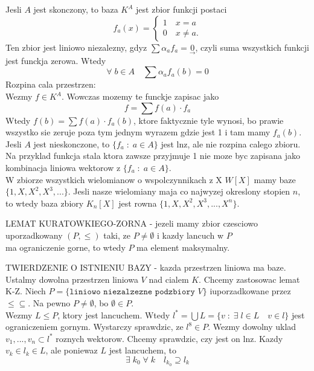 \documentclass{article}
\begin{document}
    Jesli $A$ jest skonczony, to baza $K^A$ jest zbior funkcji postaci 
    $$f_a(x)=\begin{cases}1\quad x=a\\0\quad x\neq a.\end{cases}$$
    Ten zbior jest liniowo niezalezny, gdyz $\sum\alpha_af_a=\underset{\to}{0}$, czyli suma wszystkich funkcji jest funckja zerowa. Wtedy
    $$\forall\;b\in A\quad \sum\alpha_af_a(b)=0$$
    Rozpina cala przestrzen:\smallskip\\
    Wezmy $f\in K^A$. Wowczas mozemy te funckje zapisac jako
    $$f=\sum f(a)\cdot f_a$$
    Wtedy $f(b)= \sum f(a)\cdot f_a(b)$, ktore faktycznie tyle wynosi, bo prawie wszystko sie zeruje poza tym jednym wyrazem gdzie jest 1 i tam mamy $f_a(b)$.\smallskip\\
    Jesli $A$ jest nieskonczone, to $\{f_a\;:\;a\in A\}$ jest lnz, ale nie rozpina calego zbioru. Na przyklad funkcja stala ktora zawsze przyjmuje 1 nie moze byc zapisana jako kombinacja liniowa wektorow z $\{f_a\;:\;a\in A\}$.\medskip\\
    W zbiorze wszystkich wielomianow o wspolczynnikach z X $W[X]$ mamy baze $\{1, X, X^2, X^3, ...\}$. Jesli nasze wielomiany maja co najwyzej okreslony stopien $n$, to wtedy baza zbiory $K_n[X]$ jest rowna $\{1, X, X^2, X^3, ..., X^n\}$.\bigskip\\
    \begin{center}
        \color{def}LEMAT KURATOWKIEGO-ZORNA \color{txt}- jezeli mamy zbior czesciowo \\
        uporzadkowany $(P, \leq)$ taki, ze $P\neq \emptyset$ i kazdy lancuch w $P$ \\
        ma ograniczenie gorne, to wtedy $P$ ma element maksymalny.
    \end{center}\bigskip
    \color{def}TWIERDZENIE O ISTNIENIU BAZY \color{txt}- kazda przestrzen liniowa ma baze.\medskip\\
    Ustalmy dowolna przestrzen liniowa $V$ nad cialem $K$. Chcemy zastosowac lemat K-Z. Niech $P=\{\texttt{liniowo niezalzezne podzbiory }V\}$ iuporzadkowane przez $\leq\subseteq$. Na pewno $P\neq\emptyset$, bo $\emptyset\in P$.\smallskip\\
    Wezmy $L\leq P$, ktory jest lancuchem. Wtedy $l^*=\bigcup L=\{v\;:\;\exists\;l\in L\quad v\in l\}$ jest ograniczeniem gornym. Wystarczy sprawdzic, ze $l^8\in P$. Wezmy dowolny uklad $v_1, ..., v_n\subset l^*$ roznych wektorow. Chcemy sprawdzic, czy jest on lnz. Kazdy $v_k\in l_k\in L$, ale poniewaz $L$ jest lancuchem, to
    $$\exists\;k_0\;\forall\;k\quad l_{k_0} \supseteq l_k$$
\end{document}
